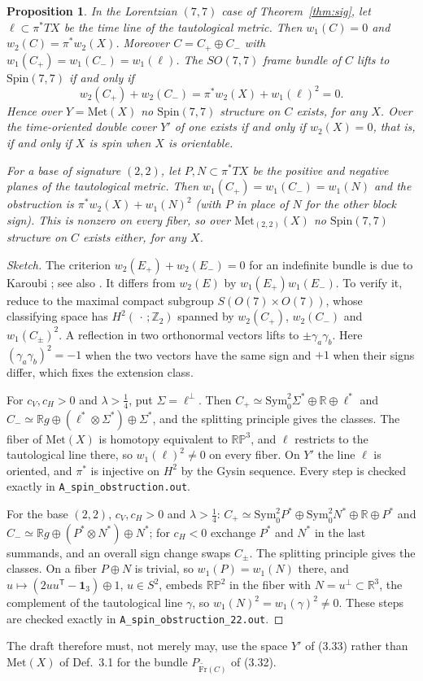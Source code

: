 \documentclass[11pt]{article}
\newtheorem{proposition}[theorem]{Proposition}
\theoremstyle{remark}
\newcommand{\Met}{\mathrm{Met}}
\begin{document}
\begin{proposition}\label{prop:spin}
In the Lorentzian $(7,7)$ case of Theorem~\ref{thm:sig}, let $\ell\subset\pi^*TX$ be the time line of the tautological metric. Then $w_1(C)=0$ and $w_2(C)=\pi^*w_2(X)$. Moreover $C=C_+\oplus C_-$ with $w_1(C_+)=w_1(C_-)=w_1(\ell)$. The $SO(7,7)$ frame bundle of $C$ lifts to $\mathrm{Spin}(7,7)$ if and only if
\[ w_2(C_+)+w_2(C_-)=\pi^*w_2(X)+w_1(\ell)^2=0 . \]
Hence over $Y=\Met(X)$ no $\mathrm{Spin}(7,7)$ structure on $C$ exists, for any $X$. Over the time-oriented double cover $Y'$ of \cite[(3.33), p.~24]{W21} one exists if and only if $w_2(X)=0$, that is, if and only if $X$ is spin when $X$ is orientable.

For a base of signature $(2,2)$, let $P,N\subset\pi^*TX$ be the positive and negative planes of the tautological metric. Then $w_1(C_+)=w_1(C_-)=w_1(N)$ and the obstruction is $\pi^*w_2(X)+w_1(N)^2$ (with $P$ in place of $N$ for the other block sign). This is nonzero on every fiber, so over $\Met_{(2,2)}(X)$ no $\mathrm{Spin}(7,7)$ structure on $C$ exists either, for any $X$.
\end{proposition}
\begin{proof}[Sketch]
The criterion $w_2(E_+)+w_2(E_-)=0$ for an indefinite bundle is due to Karoubi \cite{K68}; see also \cite{B81}. It differs from $w_2(E)$ by $w_1(E_+)w_1(E_-)$. To verify it, reduce to the maximal compact subgroup $S(O(7)\times O(7))$, whose classifying space has $H^2(\,\cdot\,;\mathbb Z_2)$ spanned by $w_2(C_+)$, $w_2(C_-)$ and $w_1(C_\pm)^2$. A reflection in two orthonormal vectors lifts to $\pm\gamma_a\gamma_b$. Here $(\gamma_a\gamma_b)^2=-1$ when the two vectors have the same sign and $+1$ when their signs differ, which fixes the extension class.

For $c_V,c_H>0$ and $\lambda>\tfrac14$, put $\Sigma=\ell^\perp$. Then $C_+\simeq\mathrm{Sym}^2_0\Sigma^*\oplus\mathbb R\oplus\ell^*$ and $C_-\simeq\mathbb Rg\oplus(\ell^*\otimes\Sigma^*)\oplus\Sigma^*$, and the splitting principle gives the classes. The fiber of $\Met(X)$ is homotopy equivalent to $\mathbb{RP}^3$, and $\ell$ restricts to the tautological line there, so $w_1(\ell)^2\neq0$ on every fiber. On $Y'$ the line $\ell$ is oriented, and $\pi^*$ is injective on $H^2$ by the Gysin sequence. Every step is checked exactly in \texttt{A\_spin\_obstruction.out}.

For the base $(2,2)$, $c_V,c_H>0$ and $\lambda>\tfrac14$: $C_+\simeq\mathrm{Sym}^2_0P^*\oplus\mathrm{Sym}^2_0N^*\oplus\mathbb R\oplus P^*$ and $C_-\simeq\mathbb Rg\oplus(P^*\otimes N^*)\oplus N^*$; for $c_H<0$ exchange $P^*$ and $N^*$ in the last summands, and an overall sign change swaps $C_\pm$. The splitting principle gives the classes. On a fiber $P\oplus N$ is trivial, so $w_1(P)=w_1(N)$ there, and $u\mapsto(2uu^{\mathsf T}-\mathbf 1_3)\oplus1$, $u\in S^2$, embeds $\mathbb{RP}^2$ in the fiber with $N=u^\perp\subset\mathbb R^3$, the complement of the tautological line $\gamma$, so $w_1(N)^2=w_1(\gamma)^2\neq0$. These steps are checked exactly in \texttt{A\_spin\_obstruction\_22.out}.
\end{proof}
The draft therefore must, not merely may, use the space $Y'$ of (3.33) rather than $\Met(X)$ of Def.~3.1 for the bundle $P_{\widetilde{\mathrm{Fr}}(C)}$ of (3.32).
\end{document}
